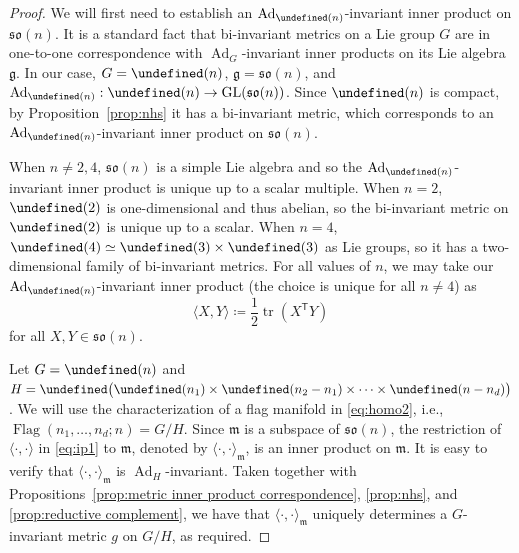 \documentclass[11pt,reqno]{amsart}%
\theoremstyle{definition}
\theoremstyle{remark}
\newcommand{\tp}{{\scriptscriptstyle\mathsf{T}}}
\let\O\undefined
\let\S\undefined
\let\SO\undefined
\DeclareMathOperator{\Flag}{Flag}
\DeclareMathOperator{\GL}{GL}
\DeclareMathOperator{\O}{O}
\DeclareMathOperator{\S}{S}
\DeclareMathOperator{\SO}{SO}
\DeclareMathOperator{\tr}{tr}
\DeclareMathOperator{\Ad}{Ad}
\begin{document}
\begin{proof}
We will first need to establish an  $\Ad_{\SO(n)}$-invariant inner product on $\mathfrak{so}(n)$.  It is a standard fact \cite{O'Neil1983} that bi-invariant metrics on a Lie group $G$ are in one-to-one correspondence with $\Ad_G$-invariant inner products on its Lie algebra $\mathfrak{g}$. In our case, $G = \SO(n)$, $\mathfrak{g} =\mathfrak{so}(n)$, and $\Ad_{\SO(n)} : \SO(n) \to \GL(\mathfrak{so}(n))$. Since $\SO(n)$ is compact,  by Proposition~\ref{prop:nhs} it has a bi-invariant metric, which corresponds to an $\Ad_{\SO(n)}$-invariant inner product on $\mathfrak{so}(n)$.

When $n \ne 2,4$, $\mathfrak{so}(n)$ is a simple Lie algebra  and so the $\Ad_{\SO(n)}$-invariant inner product is unique up to a scalar multiple. When $n  = 2$, $\SO(2)$ is one-dimensional and thus abelian, so the bi-invariant metric on $\SO(2)$ is unique up to a scalar. When $n  = 4$, $\SO(4) \simeq \SO(3) \times \SO(3)$ as Lie groups, so it has a two-dimensional family of bi-invariant metrics. For all values of $n$, we may take our $\Ad_{\SO(n)}$-invariant inner product (the choice is unique for all $n \ne 4$) as
\begin{equation}\label{eq:ip1}
\langle X,Y\rangle \coloneqq \frac{1}{2} \tr (X^\tp  Y)
\end{equation}
for all  $X,Y\in \mathfrak{so}(n)$.

Let $G =\SO(n)$ and  $H = \S\bigl(\O(n_1) \times \O(n_2 - n_1) \times \dots \times \O(n-n_d) \bigr)$. We will use the characterization of a flag manifold in \eqref{eq:homo2}, i.e., $\Flag(n_1,\dots, n_d;n) = G/ H$.
Since $\mathfrak{m}$ is a subspace of $\mathfrak{so}(n)$, the restriction of $\langle\cdot,\cdot\rangle$ in \eqref{eq:ip1} to $\mathfrak{m}$, denoted by $\langle \cdot,\cdot\rangle_{\mathfrak{m}}$, is an inner product on $\mathfrak{m}$. It is easy to verify that $\langle \cdot,\cdot\rangle_{\mathfrak{m}}$ is $\Ad_H$-invariant. Taken together with Propositions~\ref{prop:metric inner product correspondence}, \ref{prop:nhs}, and \ref{prop:reductive complement}, we have that $\langle\cdot,\cdot\rangle_{\mathfrak{m}}$ uniquely determines a $G$-invariant metric $g$ on $G/H$, as required.
\end{proof}
\end{document}
